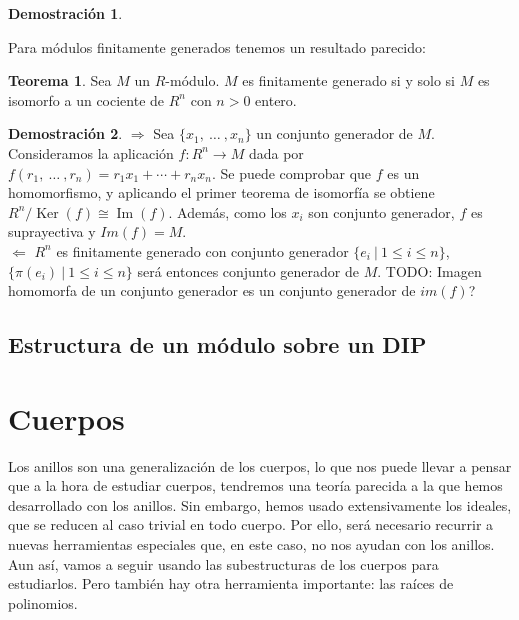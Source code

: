 \documentclass[a4paper]{book}
\theoremstyle{definition}
\newtheorem{theorem}{Teorema}[section]
\theoremstyle{ejemplo}
\theoremstyle{demostracion}
\newtheorem{dem}{Demostración}
\DeclareMathOperator{\kernel}{Ker}
\DeclareMathOperator{\image}{Im}
\begin{document}
\begin{dem}
	
\end{dem}
Para módulos finitamente generados tenemos un resultado parecido:
\begin{theorem}
	Sea $M$ un $R$-módulo. $M$ es finitamente generado si y solo si $M$ es isomorfo a un cociente de $R^n$ con $n > 0$ entero.
\end{theorem}
\begin{dem}
	$\Rightarrow$ Sea $\{x_1,\ \ldots\ ,x_n \}$ un conjunto generador de $M$. Consideramos la aplicación $f: R^n \rightarrow M$ dada por $f(r_1,\ \ldots\ , r_n) = r_1x_1 + \cdots + r_nx_n$. Se puede comprobar que $f$ es un homomorfismo, y aplicando el primer teorema de isomorfía se obtiene $R^n / \kernel(f) \cong \image(f)$. Además, como los $x_i$ son conjunto generador, $f$ es suprayectiva y $Im(f) = M$.\\ 
	$\Leftarrow$ $R^n$ es finitamente generado con conjunto generador $\{ e_i\ |\ 1 \leq i \leq n\}$, $\{ \pi(e_i)\ |\ 1 \leq i \leq n \}$ será entonces conjunto generador de $M$. TODO: Imagen homomorfa de un conjunto generador es un conjunto generador de $im(f)$?
\end{dem}

\section{Estructura de un módulo sobre un DIP}

\chapter{Cuerpos}
Los anillos son una generalización de los cuerpos, lo que nos puede llevar a pensar que a la hora de estudiar cuerpos, tendremos una teoría parecida a la que hemos desarrollado con los anillos. Sin embargo, hemos usado extensivamente los ideales, que se reducen al caso trivial en todo cuerpo. Por ello, será necesario recurrir a nuevas herramientas especiales que, en este caso, no nos ayudan con los anillos.\\ 
Aun así, vamos a seguir usando las subestructuras de los cuerpos para estudiarlos. Pero también hay otra herramienta importante: las raíces de polinomios. 
\end{document}
